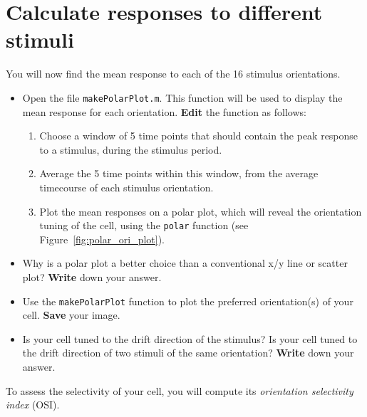 \documentclass[paper=a4, fontsize=11pt]{scrartcl} %
\numberwithin{equation}{section} %
\numberwithin{figure}{section} %
\numberwithin{table}{section} %
\begin{document}
\section{Calculate responses to different stimuli}

You will now find the mean response to each of the 16 stimulus orientations.

\begin{itemize}
\item Open the file \texttt{makePolarPlot.m}. This function will be used to display the mean response for each orientation.
  \textbf{Edit} the function as follows:
  \begin{enumerate}
  \item Choose a window of 5 time points that should contain the peak response to a stimulus, during the stimulus period.
  \item Average the 5 time points within this window, from the average timecourse of each stimulus orientation.
  \item Plot the mean responses on a polar plot, which will reveal the orientation tuning of the cell, using the \texttt{polar} function (see Figure~\ref{fig:polar_ori_plot}).
  \end{enumerate}
\item Why is a polar plot a better choice than a conventional x/y line or scatter plot? \textbf{Write} down your answer.
  \vspace{1em}
\item Use the \texttt{makePolarPlot} function to plot the preferred orientation(s) of your cell. \textbf{Save} your image.
\item Is your cell tuned to the drift direction of the stimulus? Is your cell tuned to the drift direction of two stimuli of the same orientation?
  \textbf{Write} down your answer.
  \vspace{2em}
\end{itemize}

To assess the selectivity of your cell, you will compute its \emph{orientation selectivity index} (OSI).
\end{document}
